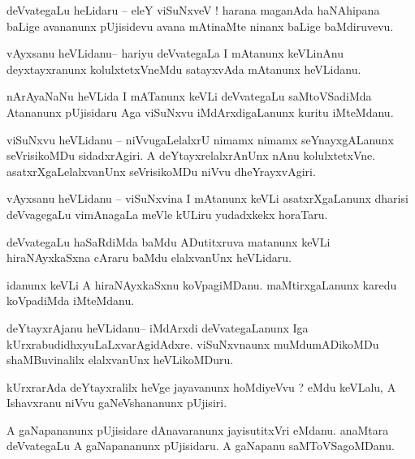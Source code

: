 \documentclass{article}
\begin{document}
\begin{mng}%
deVvategaLu heLidaru -- eleY viSuNxveV ! harana maganAda haNAhipana baLige avananunx pUjisidevu 
avana mAtinaMte ninanx baLige baMdiruvevu.
\end{mng}

\begin{mng}%
vAyxsanu heVLidanu-- hariyu deVvategaLa I mAtanunx keVLinAnu deyxtayxranunx kolulxtetxVneMdu 
satayxvAda mAtanunx heVLidanu.
\end{mng}

\begin{mng}%
nArAyaNaNu heVLida I mATanunx keVLi deVvategaLu saMtoVSadiMda Atananunx pUjisidaru Aga viSuNxvu 
iMdArxdigaLanunx kuritu iMteMdanu.
\end{mng}

\begin{mng}%
viSuNxvu heVLidanu -- niVvugaLelalxrU nimamx nimamx seYnayxgALanunx seVrisikoMDu sidadxrAgiri. A 
deYtayxrelalxrAnUnx nAnu kolulxtetxVne. asatxrXgaLelalxvanUnx seVrisikoMDu niVvu dheYrayxvAgiri.
\end{mng}

\begin{mng}%
vAyxsanu heVLidanu -- viSuNxvina I mAtanunx keVLi asatxrXgaLanunx dharisi deVvagegaLu vimAnagaLa 
meVle kULiru yudadxkekx horaTaru.
\end{mng}

\begin{mng}%
deVvategaLu haSaRdiMda baMdu ADutitxruva matanunx keVLi hiraNAyxkaSxna cAraru baMdu elalxvanUnx 
heVLidaru.
\end{mng}

\begin{mng}%
idanunx keVLi A hiraNAyxkaSxnu koVpagiMDanu. maMtirxgaLanunx karedu koVpadiMda iMteMdanu.
\end{mng}

\begin{mng}%
deYtayxrAjanu heVLidanu-- iMdArxdi deVvategaLanunx Iga kUrxrabudidhxyuLaLxvarAgidAdxre. 
viSuNxvnaunx muMdumADikoMDu shaMBuvinalilx elalxvanUnx heVLikoMDuru.
\end{mng}

\begin{mng}%
kUrxrarAda deYtayxralilx heVge jayavanunx hoMdiyeVvu ? eMdu keVLalu, A Ishavxranu niVvu 
gaNeVshananunx pUjisiri.
\end{mng}

\begin{mng}%
A gaNapananunx pUjisidare dAnavaranunx jayisutitxVri eMdanu. anaMtara deVvategaLu A gaNapananunx 
pUjisidaru. A gaNapanu saMToVSagoMDanu.
\end{mng}
\end{document}
